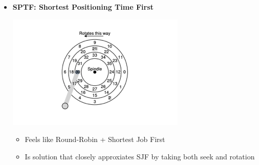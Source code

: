 \documentclass[12pt]{article}
\begin{document}
\begin{itemize}
    \item \textbf{SPTF: Shortest Positioning Time First}

    \begin{center}
        \includegraphics[width=0.6\linewidth]{../images/midterm_4_solution_54.png}
    \end{center}

    \begin{itemize}
        \item Feels like Round-Robin + Shortest Job First
        \item Is solution that closely approxiates SJF by taking both seek and rotation
    \end{itemize}
\end{itemize}
\end{document}
